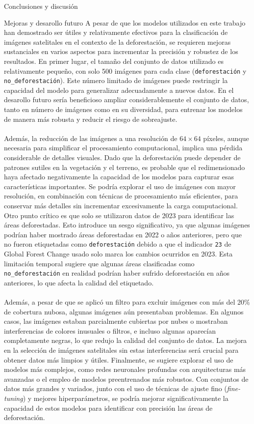 \documentclass[11pt]{article}
\begin{document}
\begin{section}{Conclusiones y discusión}
\begin{subsection}{Mejoras y desarollo futuro}
A pesar de que los modelos utilizados en este trabajo han demostrado ser útiles y relativamente efectivos para la clasificación de imágenes satelitales en el contexto de la deforestación, se requieren mejoras sustanciales en varios aspectos para incrementar la precisión y robustez de los resultados. En primer lugar, el tamaño del conjunto de datos utilizado es relativamente pequeño, con solo 500 imágenes para cada clase (\texttt{deforestación} y \texttt{no\_deforestación}). Este número limitado de imágenes puede restringir la capacidad del modelo para generalizar adecuadamente a nuevos datos. En el desarollo futuro sería beneficioso ampliar considerablemente el conjunto de datos, tanto en número de imágenes como en su diversidad, para entrenar los modelos de manera más robusta y reducir el riesgo de sobreajuste.
\\
\\
Además, la reducción de las imágenes a una resolución de $64 \times 64$ píxeles, aunque necesaria para simplificar el procesamiento computacional, implica una pérdida considerable de detalles visuales. Dado que la deforestación puede depender de patrones sutiles en la vegetación y el terreno, es probable que el redimensionado haya afectado negativamente la capacidad de los modelos para capturar esas características importantes. Se podría explorar el uso de imágenes con mayor resolución, en combinación con técnicas de procesamiento más eficientes, para conservar más detalles sin incrementar excesivamente la carga computacional. Otro punto crítico es que solo se utilizaron datos de 2023 para identificar las áreas deforestadas. Esto introduce un sesgo significativo, ya que algunas imágenes podrían haber mostrado áreas deforestadas en 2022 o años anteriores, pero que no fueron etiquetadas como \texttt{deforestación} debido a que el indicador \texttt{23} de Global Forest Change usado solo marca los cambios ocurridos en 2023. Esta limitación temporal sugiere que algunas áreas clasificadas como \texttt{no\_deforestación} en realidad podrían haber sufrido deforestación en años anteriores, lo que afecta la calidad del etiquetado.
\\
\\
Además, a pesar de que se aplicó un filtro para excluir imágenes con más del 20\% de cobertura nubosa, algunas imágenes aún presentaban problemas. En algunos casos, las imágenes estaban parcialmente cubiertas por nubes o mostraban interferencias de colores inusuales o filtros, e incluso algunas aparecían completamente negras, lo que redujo la calidad del conjunto de datos. La mejora en la selección de imágenes satelitales sin estas interferencias será crucial para obtener datos más limpios y útiles. Finalmente, se sugiere explorar el uso de modelos más complejos, como redes neuronales profundas con arquitecturas más avanzadas o el empleo de modelos preentrenados más robustos. Con conjuntos de datos más grandes y variados, junto con el uso de técnicas de ajuste fino (\textit{fine-tuning}) y mejores hiperparámetros, se podría mejorar significativamente la capacidad de estos modelos para identificar con precisión las áreas de deforestación.

\end{subsection}
\end{section}
\end{document}
